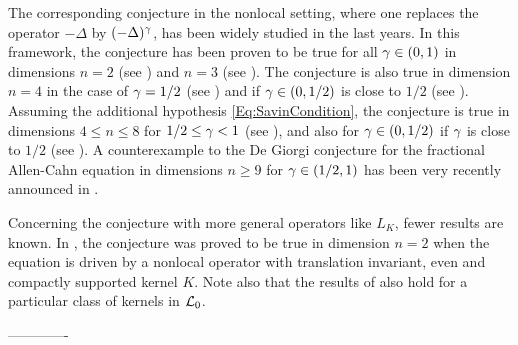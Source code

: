 


The corresponding conjecture in the nonlocal setting, where one replaces the operator $-\Delta$ by $(-\Delta)^\gamma$, has been widely studied in the last years. In this framework, the conjecture has been proven to be true for all $\gamma\in(0,1)$ in dimensions $n=2$ (see \cite{CabreSolaMorales, CabreSireI,SireValdinoci,BucurValdinoci-DeGiorgi}) and $n=3$ (see \cite{CabreCinti-EnergyHalfL, CabreCinti-SharpEnergy,DipierroFarinaValdinoci}). The conjecture is also true in dimension $n=4$ in the case of $\gamma = 1/2$ (see \cite{FigalliSerra}) and if $\gamma\in(0,1/2)$ is close to $1/2$ (see \cite{CabreCintiSerra-Stable}). Assuming the additional hypothesis \eqref{Eq:SavinCondition}, the conjecture is true in dimensions $4\leq n \leq 8$ for $1/2 \leq \gamma < 1$ (see \cite{Savin-Fractional,Savin-Fractional2}), and also for $\gamma\in(0,1/2)$ if $\gamma$ is close to $1/2$ (see \cite{DipierroSerraValdinoci}). A counterexample to the De Giorgi conjecture for the fractional Allen-Cahn equation in dimensions $n \geq 9$ for $\gamma \in (1/2,1)$ has been very recently announced in \cite{ChanLiuWei}.

Concerning the conjecture with more general operators like $L_K$, fewer results are known. In \cite{HamelRosOtonSireValdinoci}, the conjecture was proved to be true in dimension $n=2$ when the equation is driven by a nonlocal operator with translation invariant, even and compactly supported kernel $K$. Note also that the results of \cite{DipierroSerraValdinoci} also hold for a particular class of kernels in $\mathcal{L}_0$.






\bigskip
\bigskip
\bigskip
-------------
\bigskip
\bigskip
\bigskip

